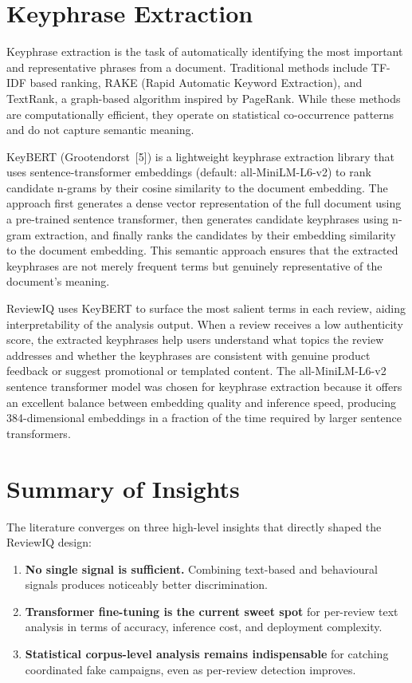 \documentclass[12pt,a4paper,oneside]{report}
\renewcommand{\texttt}[1]{%
  {\ttfamily\hyphenchar\font=45\relax #1}}
\begin{document}
\section{Keyphrase Extraction}
Keyphrase extraction is the task of automatically identifying the most
important and representative phrases from a document. Traditional methods
include TF-IDF based ranking, RAKE (Rapid Automatic Keyword Extraction),
and TextRank, a graph-based algorithm inspired by PageRank. While these
methods are computationally efficient, they operate on statistical
co-occurrence patterns and do not capture semantic meaning.

KeyBERT (Grootendorst~[5]) is a lightweight keyphrase extraction library
that uses sentence-transformer embeddings (default:
\texttt{all-MiniLM-L6-v2}) to rank candidate n-grams by their cosine
similarity to the document embedding. The approach first generates a dense
vector representation of the full document using a pre-trained sentence
transformer, then generates candidate keyphrases using n-gram extraction,
and finally ranks the candidates by their embedding similarity to the
document embedding. This semantic approach ensures that the extracted
keyphrases are not merely frequent terms but genuinely representative of
the document's meaning.

ReviewIQ uses KeyBERT to surface the most salient terms in each review,
aiding interpretability of the analysis output. When a review receives
a low authenticity score, the extracted keyphrases help users understand
what topics the review addresses and whether the keyphrases are consistent
with genuine product feedback or suggest promotional or templated content.
The \texttt{all-MiniLM-L6-v2} sentence transformer model was chosen for
keyphrase extraction because it offers an excellent balance between
embedding quality and inference speed, producing 384-dimensional embeddings
in a fraction of the time required by larger sentence transformers.

\section{Summary of Insights}
The literature converges on three high-level insights that directly shaped
the ReviewIQ design:
\begin{enumerate}
  \item \textbf{No single signal is sufficient.} Combining text-based and
        behavioural signals produces noticeably better discrimination.
  \item \textbf{Transformer fine-tuning is the current sweet spot} for
        per-review text analysis in terms of accuracy, inference cost,
        and deployment complexity.
  \item \textbf{Statistical corpus-level analysis remains indispensable}
        for catching coordinated fake campaigns, even as per-review
        detection improves.
\end{enumerate}
\end{document}
